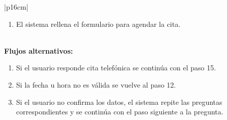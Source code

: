\begin{longtable}{|p{16cm}|}
\begin{minipage}[t]{\linewidth}
\begin{enumerate}
                \item El sistema rellena el formulario para agendar la cita.
            \end{enumerate} 
            \vspace{1mm}
        \end{minipage} \\ \hline
        \textbf{Flujos alternativos:} \\
        \begin{minipage}[t]{\linewidth}
            \begin{enumerate}
                \item[9.a.] Si el usuario responde cita telefónica se continúa con el paso 15.
                \item[14.a.] Si la fecha u hora no es válida se vuelve al paso 12.
                \item[16.a] Si el usuario no confirma los datos, el sistema repite las preguntas correspondientes y se continúa con el paso siguiente a la pregunta.
            \end{enumerate}
            \vspace{1mm}
        \end{minipage} \\ \hline
        \caption{Descripción general del caso de uso - Solicitud de cita en la Agencia Tributaria.}
        \end{longtable}
        
